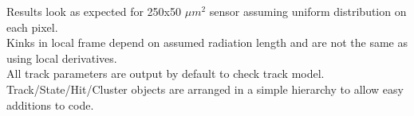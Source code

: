 \documentclass{beamer}
\begin{document}
\begin{frame}
\begin{columns}[t]
\tiny{
\vspace{10pt}
Results look as expected for 250x50 $\mu m^{2}$ sensor assuming uniform distribution on each pixel. \\
\vspace{10pt}
Kinks in local frame depend on assumed radiation length and are not the same as using local derivatives. \\
\vspace{10pt}
All track parameters are output by default to check track model. \\
\vspace{10pt}
Track/State/Hit/Cluster objects are arranged in a simple hierarchy to allow easy additions to code.\\
}
\end{columns}
\end{frame}
\end{document}
